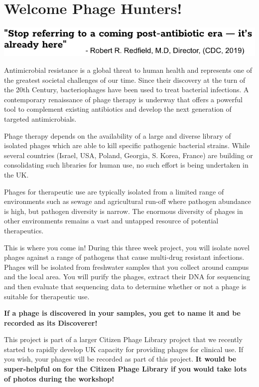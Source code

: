 \documentclass[
]{book}
\author{}
\date{\vspace{-2.5em}}
\begin{document}
{
\setcounter{tocdepth}{1}
\tableofcontents
}
\pagebreak

\hypertarget{welcome-phage-hunters}{%
\chapter*{Welcome Phage Hunters!}\label{welcome-phage-hunters}}

\includegraphics{images/redford.png}

Antimicrobial resistance is a global threat to human health and represents one of the greatest societal challenges of our time. Since their discovery at the turn of the 20th Century, bacteriophages have been used to treat bacterial infections. A contemporary renaissance of phage therapy is underway that offers a powerful tool to complement existing antibiotics and develop the next generation of targeted antimicrobials.

Phage therapy depends on the availability of a large and diverse library of isolated phages which are able to kill specific pathogenic bacterial strains. While several countries (Israel, USA, Poland, Georgia, S. Korea, France) are building or consolidating such libraries for human use, no such effort is being undertaken in the UK.

Phages for therapeutic use are typically isolated from a limited range of environments such as sewage and agricultural run-off where pathogen abundance is high, but pathogen diversity is narrow. The enormous diversity of phages in other environments remains a vast and untapped resource of potential therapeutics.

This is where you come in! During this three week project, you will isolate novel phages against a range of pathogens that cause multi-drug resistant infections. Phages will be isolated from freshwater samples that you collect around campus and the local area. You will purify the phages, extract their DNA for sequencing and then evaluate that sequencing data to determine whether or not a phage is suitable for therapeutic use.

\textbf{If a phage is discovered in your samples, you get to name it and be recorded as its Discoverer!}

This project is part of a larger Citizen Phage Library project that we recently started to rapidly develop UK capacity for providing phages for clinical use. If you wish, your phages will be recorded as part of this project. \textbf{It would be super-helpful on for the Citizen Phage Library if you would take lots of photos during the workshop!}
\end{document}
